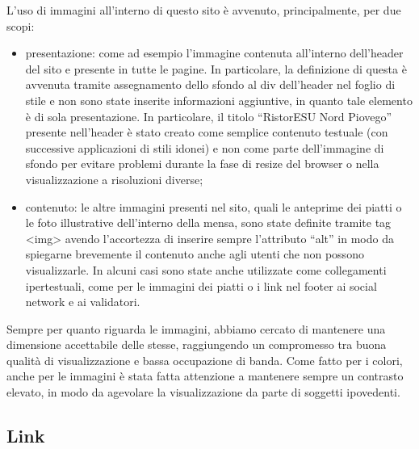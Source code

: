 \documentclass[10pt,a4paper,onecolumn]{article}
\begin{document}
L’uso di immagini all’interno di questo sito è avvenuto, principalmente, per due scopi:
\begin{itemize}
 \item presentazione: come ad esempio l’immagine contenuta all’interno dell’header del sito e presente in tutte le pagine. In particolare, la definizione di questa è avvenuta tramite assegnamento dello sfondo al div dell’header nel foglio di stile e non sono state inserite informazioni aggiuntive, in quanto tale elemento è di sola presentazione. In particolare, il titolo ``RistorESU Nord Piovego'' presente nell’header è stato creato come semplice contenuto testuale (con successive applicazioni di stili idonei) e non come parte dell’immagine di sfondo per evitare problemi durante la fase di resize del browser o nella visualizzazione a risoluzioni diverse;
 \item contenuto: le altre immagini presenti nel sito, quali le anteprime dei piatti o le foto illustrative dell’interno della mensa, sono state definite tramite tag <img> avendo l’accortezza di inserire sempre l’attributo ``alt'' in modo da spiegarne brevemente il contenuto anche agli utenti che non possono visualizzarle.  In alcuni casi sono state anche utilizzate come collegamenti ipertestuali, come per le immagini dei piatti o i link nel footer ai social network e ai validatori.
\end{itemize}
Sempre per quanto riguarda le immagini, abbiamo cercato di mantenere una dimensione accettabile delle stesse, raggiungendo un compromesso tra buona qualità di visualizzazione e bassa occupazione di banda. Come fatto per i colori, anche per le immagini è stata fatta attenzione a mantenere sempre un contrasto elevato, in modo da agevolare la visualizzazione da parte di soggetti ipovedenti.

\subsection{Link}
\end{document}

